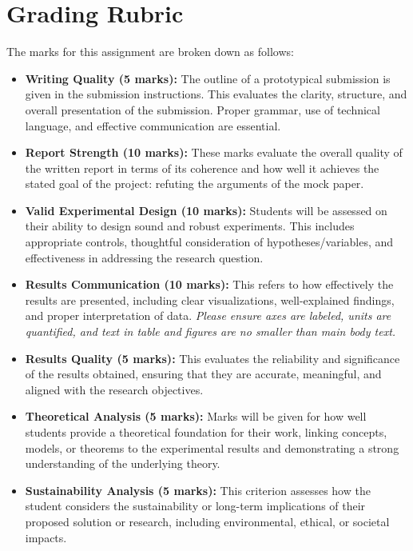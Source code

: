 \documentclass{article}
\newcommand{\csection}[1]{\section{\textcolor{imperialblue}{#1}}}
\begin{document}
\csection{Grading Rubric}

The marks for this assignment are broken down as follows: 

\begin{itemize}
    \item \textbf{Writing Quality (5 marks):} The outline of a prototypical submission is given in the submission instructions. This evaluates the clarity, structure, and overall presentation of the submission. Proper grammar, use of technical language, and effective communication are essential.
  
    \item \textbf{Report Strength (10 marks):} These marks evaluate the overall quality of the written report in terms of its coherence and how well it achieves the stated goal of the project: refuting the arguments of the mock paper. 

    \item \textbf{Valid Experimental Design (10 marks):} Students will be assessed on their ability to design sound and robust experiments. This includes appropriate controls, thoughtful consideration of hypotheses/variables, and effectiveness in addressing the research question.

    \item \textbf{Results Communication (10 marks):} This refers to how effectively the results are presented, including clear visualizations, well-explained findings, and proper interpretation of data. \textit{Please ensure axes are labeled, units are quantified, and text in table and figures are no smaller than main body text.}

    \item \textbf{Results Quality (5 marks):} This evaluates the reliability and significance of the results obtained, ensuring that they are accurate, meaningful, and aligned with the research objectives.
  
    \item \textbf{Theoretical Analysis (5 marks):} Marks will be given for how well students provide a theoretical foundation for their work, linking concepts, models, or theorems to the experimental results and demonstrating a strong understanding of the underlying theory.

    \item \textbf{Sustainability Analysis (5 marks):} This criterion assesses how the student considers the sustainability or long-term implications of their proposed solution or research, including environmental, ethical, or societal impacts.
    
\end{itemize}
\end{document}
